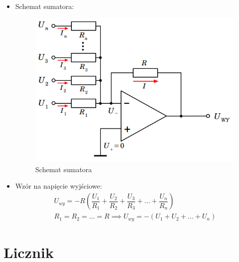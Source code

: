 \begin{itemize}
    \item Schemat sumatora:
        \begin{figure}[H]
            \centering
            \includegraphics[scale=0.4]{img/schemes/sumator.png}
            \caption{Schemat sumatora}
            \label{fig:schemat_sumatora}
        \end{figure}
    \item Wzór na napięcie wyjściowe:
        \begin{gather}
            U_{wy} = -R(\dfrac{U_1}{R_1} + \dfrac{U_2}{R_2} + \dfrac{U_3}{R_3} + \dots + \dfrac{U_n}{R_n}) \\
            R_1 = R_2 = \dots = R \implies U_{wy} = -(U_1 + U_2 + \dots + U_n)
        \end{gather}
\end{itemize}

\section{Licznik}

